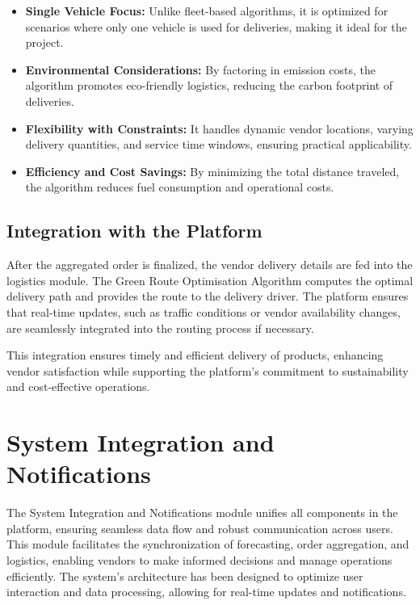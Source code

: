 \begin{itemize}
    \item \textbf{Single Vehicle Focus:} Unlike fleet-based algorithms, it is optimized for scenarios where only one vehicle is used for deliveries, making it ideal for the project.
    \item \textbf{Environmental Considerations:} By factoring in emission costs, the algorithm promotes eco-friendly logistics, reducing the carbon footprint of deliveries.
    \item \textbf{Flexibility with Constraints:} It handles dynamic vendor locations, varying delivery quantities, and service time windows, ensuring practical applicability.
    \item \textbf{Efficiency and Cost Savings:} By minimizing the total distance traveled, the algorithm reduces fuel consumption and operational costs.
\end{itemize}

\subsection{Integration with the Platform}

After the aggregated order is finalized, the vendor delivery details are fed into the logistics module. The Green Route Optimisation Algorithm computes the optimal delivery path and provides the route to the delivery driver. The platform ensures that real-time updates, such as traffic conditions or vendor availability changes, are seamlessly integrated into the routing process if necessary.

This integration ensures timely and efficient delivery of products, enhancing vendor satisfaction while supporting the platform's commitment to sustainability and cost-effective operations.

\section{System Integration and Notifications}

The System Integration and Notifications module unifies all components in the platform, ensuring seamless data flow and robust communication across users. This module facilitates the synchronization of forecasting, order aggregation, and logistics, enabling vendors to make informed decisions and manage operations efficiently. The system's architecture has been designed to optimize user interaction and data processing, allowing for real-time updates and notifications.

